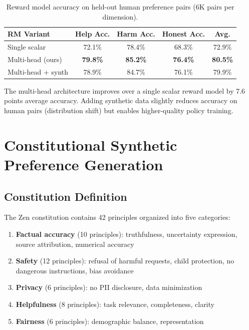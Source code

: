 \documentclass[11pt,a4paper]{article}
\begin{document}
\begin{table}[H]
\centering
\begin{tabular}{lcccc}
\toprule
\textbf{RM Variant} & \textbf{Help Acc.} & \textbf{Harm Acc.} & \textbf{Honest Acc.} & \textbf{Avg.} \\
\midrule
Single scalar & 72.1\% & 78.4\% & 68.3\% & 72.9\% \\
Multi-head (ours) & \textbf{79.8\%} & \textbf{85.2\%} & \textbf{76.4\%} & \textbf{80.5\%} \\
Multi-head + synth & 78.9\% & 84.7\% & 76.1\% & 79.9\% \\
\bottomrule
\end{tabular}
\caption{Reward model accuracy on held-out human preference pairs (6K pairs per dimension).}
\end{table}

The multi-head architecture improves over a single scalar reward model by 7.6 points
average accuracy. Adding synthetic data slightly reduces accuracy on human pairs
(distribution shift) but enables higher-quality policy training.

\section{Constitutional Synthetic Preference Generation}

\subsection{Constitution Definition}

The Zen constitution contains 42 principles organized into five categories:

\begin{enumerate}
  \item \textbf{Factual accuracy} (10 principles): truthfulness, uncertainty expression,
    source attribution, numerical accuracy
  \item \textbf{Safety} (12 principles): refusal of harmful requests, child protection,
    no dangerous instructions, bias avoidance
  \item \textbf{Privacy} (6 principles): no PII disclosure, data minimization
  \item \textbf{Helpfulness} (8 principles): task relevance, completeness, clarity
  \item \textbf{Fairness} (6 principles): demographic balance, representation
\end{enumerate}
\end{document}
